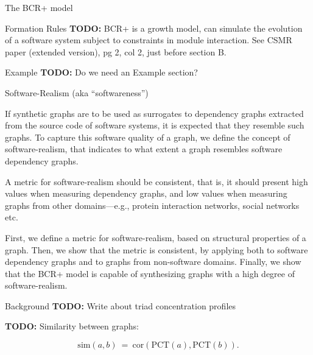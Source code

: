 \documentclass[11pt,twocolumn,a4paper,english]{article}
\newcommand{\TODO}{\textbf{TODO:} }
\begin{document}
\begin{section}{The BCR+ model}
\begin{subsection}{Formation Rules}
	\TODO BCR+ is a growth model, can simulate the evolution of a software system subject to constraints in module interaction. See CSMR paper (extended version), pg 2, col 2, just before section B. 
	
\end{subsection}

\begin{subsection}{Example}
	\TODO Do we need an Example section?
\end{subsection}
	
\end{section}


\begin{section}{Software-Realism (aka “softwareness”)}
	
	If synthetic graphs are to be used as surrogates to dependency graphs extracted from the source code of software systems, it is expected that they resemble such graphs. To capture this software quality of a graph, we define the concept of software-realism, that indicates to what extent a graph resembles software dependency graphs.
	
	A metric for software-realism should be consistent, that is, it should present high values when measuring dependency graphs, and low values when measuring graphs from other domains---e.g., protein interaction networks, social networks etc.
	
	First, we define a metric for software-realism, based on structural properties of a graph. Then, we show that the metric is consistent, by applying both to software dependency graphs and to graphs from non-software domains. Finally, we show that the BCR+ model is capable of synthesizing graphs with a high degree of software-realism.
	
\begin{subsection}{Background}
	\TODO Write about triad concentration profiles \cite{Milo2002}
	
	\TODO Similarity between graphs:
	
	$$
  \mathrm{sim}(a, b) ~=~ 
    \mathrm{cor}(\mathrm{PCT}(a), \mathrm{PCT}(b))\mathrm{.}
  $$
		
	\end{subsection}
	

\end{section}
\end{document}
